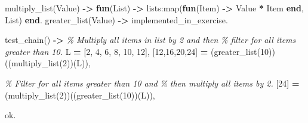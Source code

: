 \documentclass[
]{book}
\newenvironment{Shaded}{\begin{snugshade}}{\end{snugshade}}
\newcommand{\CharTok}[1]{\textcolor[rgb]{0.31,0.60,0.02}{#1}}
\newcommand{\CommentTok}[1]{\textcolor[rgb]{0.56,0.35,0.01}{\textit{#1}}}
\newcommand{\DecValTok}[1]{\textcolor[rgb]{0.00,0.00,0.81}{#1}}
\newcommand{\FunctionTok}[1]{\textcolor[rgb]{0.00,0.00,0.00}{#1}}
\newcommand{\KeywordTok}[1]{\textcolor[rgb]{0.13,0.29,0.53}{\textbf{#1}}}
\newcommand{\OperatorTok}[1]{\textcolor[rgb]{0.81,0.36,0.00}{\textbf{#1}}}
\newcommand{\VariableTok}[1]{\textcolor[rgb]{0.00,0.00,0.00}{#1}}
\begin{document}
\begin{Shaded}
\begin{Highlighting}[]
\FunctionTok{multiply\_list(}\VariableTok{Value}\FunctionTok{)} \OperatorTok{{-}\textgreater{}} \KeywordTok{fun}\FunctionTok{(}\VariableTok{List}\FunctionTok{)} \OperatorTok{{-}\textgreater{}} \FunctionTok{lists:map(}\KeywordTok{fun}\FunctionTok{(}\VariableTok{Item}\FunctionTok{)} \OperatorTok{{-}\textgreater{}} \VariableTok{Value} \OperatorTok{*} \VariableTok{Item} \KeywordTok{end}\FunctionTok{,} \VariableTok{List}\FunctionTok{)} \KeywordTok{end}\FunctionTok{.}
\FunctionTok{greater\_list(}\VariableTok{Value}\FunctionTok{)} \OperatorTok{{-}\textgreater{}} \CharTok{implemented\_in\_exercise}\FunctionTok{.}

\FunctionTok{test\_chain()} \OperatorTok{{-}\textgreater{}}
   \CommentTok{\% Multiply all items in list by 2 and then}
   \CommentTok{\% filter for all items greater than 10.}
   \VariableTok{L} \OperatorTok{=} \FunctionTok{[}\DecValTok{2}\FunctionTok{,} \DecValTok{4}\FunctionTok{,} \DecValTok{6}\FunctionTok{,} \DecValTok{8}\FunctionTok{,} \DecValTok{10}\FunctionTok{,} \DecValTok{12}\FunctionTok{],}
   \FunctionTok{[}\DecValTok{12}\FunctionTok{,}\DecValTok{16}\FunctionTok{,}\DecValTok{20}\FunctionTok{,}\DecValTok{24}\FunctionTok{]} \OperatorTok{=} \FunctionTok{(greater\_list(}\DecValTok{10}\FunctionTok{))((multiply\_list(}\DecValTok{2}\FunctionTok{))(}\VariableTok{L}\FunctionTok{)),}

   \CommentTok{\% Filter for all items greater than 10 and }
   \CommentTok{\% then multiply all items by 2.}
   \FunctionTok{[}\DecValTok{24}\FunctionTok{]} \OperatorTok{=} \FunctionTok{(multiply\_list(}\DecValTok{2}\FunctionTok{))((greater\_list(}\DecValTok{10}\FunctionTok{))(}\VariableTok{L}\FunctionTok{)),}

   \CharTok{ok}\FunctionTok{.}
\end{Highlighting}
\end{Shaded}
\end{document}
